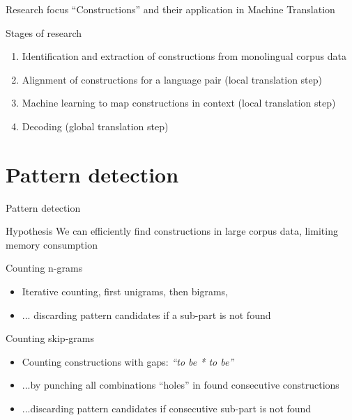 \documentclass[compress]{beamer}
\begin{document}
\begin{frame}
	\begin{block}{Research focus}
		``Constructions'' and their application in Machine Translation
	\end{block}

	\begin{block}{Stages of research}
		\begin{enumerate}
			\item Identification and extraction of constructions from monolingual corpus data 
			\item Alignment of constructions for a language pair (local translation step)
			\item Machine learning to map constructions in context (local translation step)
			\item Decoding (global translation step)
		\end{enumerate}
	\end{block}
\end{frame}



\section{Pattern detection}

\begin{frame}{Pattern detection}

	\begin{block}{Hypothesis}
		We can efficiently find constructions in large corpus data, limiting memory consumption
	\end{block}

	\begin{block}{Counting n-grams}
		\begin{itemize}
			\item Iterative counting, first unigrams, then bigrams, 
			\item  ... discarding pattern candidates if a sub-part is not found
		\end{itemize}
	\end{block}

	\begin{block}{Counting skip-grams}
		\begin{itemize}
			\item Counting constructions with gaps: \emph{``to be * to be''}
			\item ...by punching all combinations ``holes'' in found consecutive constructions
			\item ...discarding pattern candidates if consecutive sub-part is not found
		\end{itemize}
	\end{block}

\end{frame}
\end{document}
